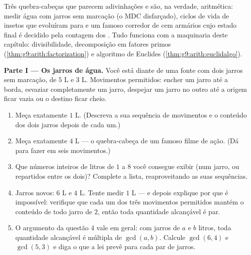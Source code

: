 \begin{problem}
\label{pb:g9:arith:1}
Três quebra-cabeças que parecem adivinhações e são, na verdade,
aritmética: medir água com jarros sem marcação (o MDC disfarçado),
ciclos de vida de insetos que evoluíram para  e um famoso
corredor de cem armários cujo estado final é decidido pela contagem dos
. Tudo funciona com a maquinaria deste capítulo:
divisibilidade, decomposição em fatores primos
(\cref{thm:g9:arith:factorization}) e algoritmo de Euclides
(\cref{thm:g9:arith:euclidalgo}).

\medskip
\noindent\textbf{Parte I --- Os jarros de água.}
Você está diante de uma fonte com dois jarros sem marcação, de $5$ L e
$3$ L. Movimentos permitidos: encher um jarro até a borda, esvaziar
completamente um jarro, despejar um jarro no outro até a origem ficar
vazia ou o destino ficar cheio.
\begin{enumerate}
  \item Meça exatamente $1$ L. (Descreva a sua sequência de movimentos
        e o conteúdo dos dois jarros depois de cada um.)
  \item Meça exatamente $4$ L --- o quebra-cabeça de um famoso filme de
        ação. (Dá para fazer em seis movimentos.)
  \item Que números inteiros de litros de $1$ a $8$ você consegue
        exibir (num jarro, ou repartidos entre os dois)? Complete a
        lista, reaproveitando as suas sequências.
  \item Jarros novos: $6$ L e $4$ L. Tente medir $1$ L --- e depois
        explique por que é impossível: verifique que cada um dos três
        movimentos permitidos mantém o conteúdo de todo jarro 
        de $2$, então toda quantidade alcançável é par.
  \item O argumento da questão 4 vale em geral: com jarros de $a$ e $b$
        litros, toda quantidade alcançável é múltipla de $\gcd(a, b)$.
        Calcule $\gcd(6, 4)$ e $\gcd(5, 3)$ e diga o que a lei prevê
        para cada par de jarros.
\end{enumerate}


\end{problem}
